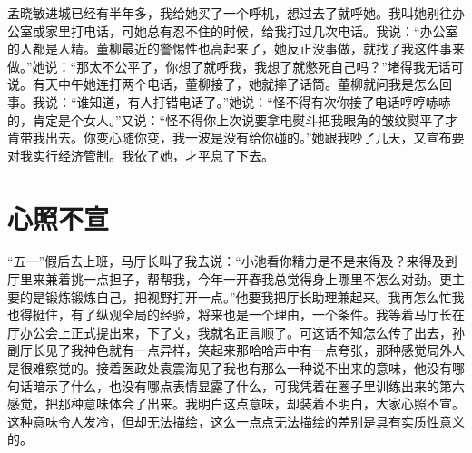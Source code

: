\documentclass[12pt,oneside]{book}
\begin{document}
孟晓敏进城已经有半年多，我给她买了一个呼机，想过去了就呼她。我叫她别往办公室或家里打电话，可她总有忍不住的时候，给我打过几次电话。我说：``办公室的人都是人精。董柳最近的警惕性也高起来了，她反正没事做，就找了我这件事来做。''她说：``那太不公平了，你想了就呼我，我想了就憋死自己吗？''堵得我无话可说。有天中午她连打两个电话，董柳接了，她就摔了话筒。董柳就问我是怎么回事。我说：``谁知道，有人打错电话了。''她说：``怪不得有次你接了电话哼哼哧哧的，肯定是个女人。''又说：``怪不得你上次说要拿电熨斗把我眼角的皱纹熨平了才肯带我出去。你变心随你变，我一波是没有给你碰的。''她跟我吵了几天，又宣布要对我实行经济管制。我依了她，才平息了下去。


\chapter{心照不宣}

``五一''假后去上班，马厅长叫了我去说：``小池看你精力是不是来得及？来得及到厅里来兼着挑一点担子，帮帮我，今年一开春我总觉得身上哪里不怎么对劲。更主要的是锻炼锻炼自己，把视野打开一点。''他要我把厅长助理兼起来。我再怎么忙我也得挺住，有了纵观全局的经验，将来也是一个理由，一个条件。我等着马厅长在厅办公会上正式提出来，下了文，我就名正言顺了。可这话不知怎么传了出去，孙副厅长见了我神色就有一点异样，笑起来那哈哈声中有一点夸张，那种感觉局外人是很难察觉的。接着医政处袁震海见了我也有那么一种说不出来的意味，他没有哪句话暗示了什么，也没有哪点表情显露了什么，可我凭着在圈子里训练出来的第六感觉，把那种意味体会了出来。我明白这点意味，却装着不明白，大家心照不宣。这种意味令人发冷，但却无法描绘，这么一点点无法描绘的差别是具有实质性意义的。
\end{document}
